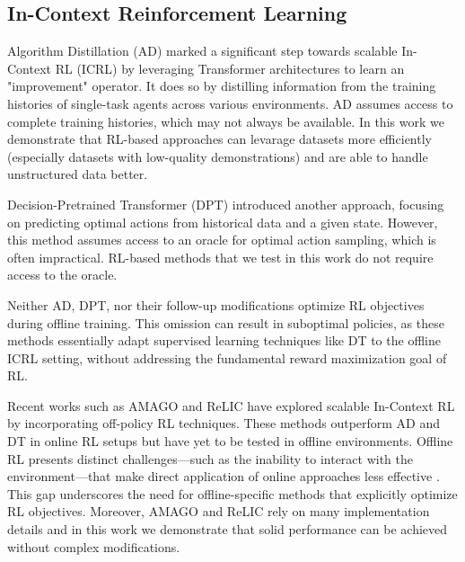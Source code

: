 \documentclass{article} %
\begin{document}
\subsection{In-Context Reinforcement Learning}
Algorithm Distillation (AD) \citep{laskin2022context} marked a significant step towards scalable In-Context RL (ICRL) by leveraging Transformer architectures to learn an "improvement" operator. It does so by distilling information from the training histories of single-task agents across various environments. AD assumes access to complete training histories, which may not always be available. In this work we demonstrate that RL-based approaches can levarage datasets more efficiently (especially datasets with low-quality demonstrations) and are able to handle unstructured data better.

Decision-Pretrained Transformer (DPT) \citep{lee2024supervised} introduced another approach, focusing on predicting optimal actions from historical data and a given state. However, this method assumes access to an oracle for optimal action sampling, which is often impractical. RL-based methods that we test in this work do not require access to the oracle.

Neither AD, DPT, nor their follow-up modifications \citep{sinii2023context, schmied2024retrieval, dai2024context, huang2024context, sondistilling, zisman2024n} optimize RL objectives during offline training. This omission can result in suboptimal policies, as these methods essentially adapt supervised learning techniques like DT to the offline ICRL setting, without addressing the fundamental reward maximization goal of RL.

Recent works such as AMAGO \citep{grigsby2023amago} and ReLIC \citep{elawady2024relic} have explored scalable In-Context RL by incorporating off-policy RL techniques. These methods outperform AD and DT in online RL setups but have yet to be tested in offline environments. Offline RL presents distinct challenges—such as the inability to interact with the environment—that make direct application of online approaches less effective \citep{fujimoto2019off, levine2020offline}. This gap underscores the need for offline-specific methods that explicitly optimize RL objectives.  Moreover, AMAGO and ReLIC rely on many implementation details and in this work we demonstrate that solid performance can be achieved without complex modifications.
\end{document}
